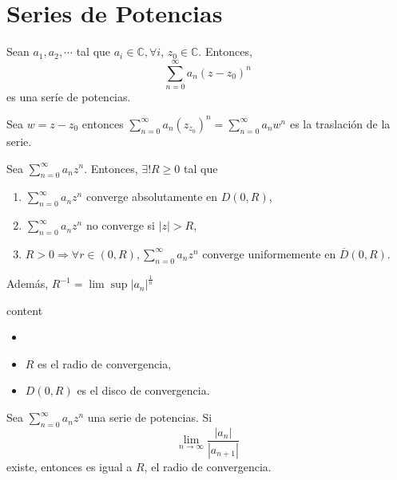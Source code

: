 \section{Series de Potencias}

\begin{defn}
  Sean $a_{1}, a_{2} , \cdots $ tal que $a_{i} \in \mathbb{C}, \forall i$, $z_{0} \in \mathbb{C}$. Entonces,
  \[
    \sum_{n = 0}^{\infty} a_{n}(z - z_{0})^{n}
  \] 
  es una seríe de potencias.
\end{defn}

\begin{obs}
  Sea $w = z - z_{0}$ entonces $\sum_{n = 0}^{\infty} a_{n}(z _ z_{0})^{n} = \sum_{n = 0}^{\infty} a_{n}w^{n}$ es la traslación de la serie.
\end{obs}

\begin{theo}
  Sea $\sum_{n = 0}^{\infty} a_{n}z^{n}$. Entonces, $\exists ! R \geq 0$ tal que
  \begin{enumerate}[label=(\roman*)]
    \item $\sum_{n = 0}^{\infty} a_{n}z^{n}$ converge absolutamente en $D(0, R)$,
    \item $\sum_{n = 0}^{\infty} a_{n}z^{n}$ no converge si $| z | > R$,
    \item $R>0 \Rightarrow \forall r \in (0,R), \sum_{n = 0}^{\infty} a_{n}z^{n}$ converge uniformemente en $\overline{D}(0, R)$.
  \end{enumerate}
  Además, $R^{-1} = \lim \sup | a_{n} |^{\frac{1}{n}}$
\end{theo}

\begin{dem}
  content
\end{dem}

\begin{nota}
  \begin{itemize}
    \item []
    \item $R$ es el radio de convergencia,
    \item $D(0, R)$ es el disco de convergencia.
  \end{itemize}
\end{nota}

\begin{prop}
  Sea $\sum_{n = 0}^{\infty} a_{n}z^{n}$ una serie de potencias. Si
  \[ 
    \lim_{n \to \infty} \frac{\big |a_{n} \big |}{| a_{n+1} |}
  \] 
  existe, entonces es igual a $R$, el radio de convergencia.
\end{prop}

